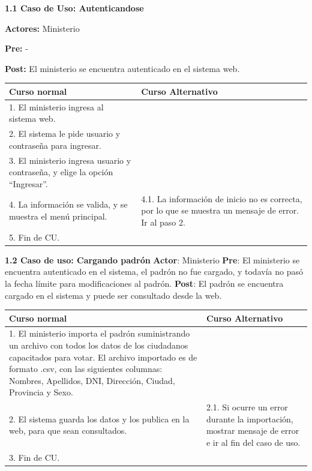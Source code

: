 \textbf{1.1 Caso de Uso: Autenticandose}

\textbf{Actores:} Ministerio

\textbf{Pre:} -

\textbf{Post:} El ministerio se encuentra autenticado en el sistema web.
\begin{table}[h!]
	
 \begin{tabular}{|p{7.5cm} | p{7.5cm}|} 
 \hline
 \textbf{Curso normal} & \textbf{Curso Alternativo} \\
 \hline
 1. El ministerio ingresa al sistema web. & \\
 \hline
 
 2. El sistema le pide usuario y contraseña para ingresar. & \\
 \hline 
 3. El ministerio ingresa usuario y contraseña, y elige la opción “Ingresar”. & \\
 \hline 
 4. La información se valida, y se muestra el menú principal. & 
4.1. La información de inicio no es correcta, por lo que se muestra un mensaje de error. Ir al paso 2.
\\
 \hline 
 5. Fin de CU. & \\

 \hline
 \end{tabular}

\end{table}


\textbf{1.2 Caso de uso: Cargando padrón}
\textbf{Actor}: Ministerio
\textbf{Pre}: El ministerio se encuentra autenticado en el sistema, el padrón no fue cargado, y todavía no pasó la fecha límite para modificaciones al padrón.
\textbf{Post}: El padrón se encuentra cargado en el sistema y puede ser consultado desde la web.
\begin{table}[h!]
	
 \begin{tabular}{|p{7.5cm} | p{7.5cm}|} 
 \hline
 \textbf{Curso normal} & \textbf{Curso Alternativo} \\
 \hline
1. El ministerio importa el padrón suministrando un archivo con todos los datos de los ciudadanos capacitados para votar.
El archivo importado es de formato .csv, con las siguientes columnas: Nombres, Apellidos, DNI, Dirección, Ciudad, Provincia y Sexo. & \\
\hline

2. El sistema guarda los datos y los publica en la web, para que sean consultados. &
2.1. Si ocurre un error durante la importación, mostrar mensaje de error e ir al fin del caso de uso. \\
\hline
3. Fin de CU. & \\

 \end{tabular}

\end{table}





